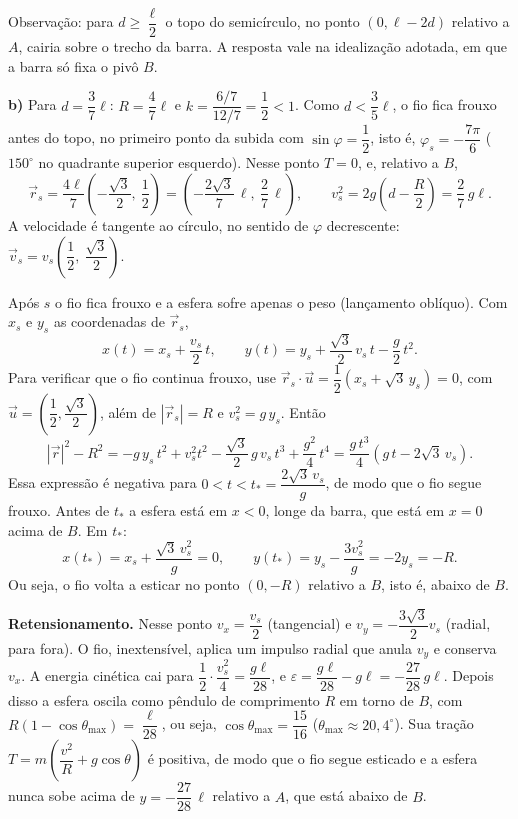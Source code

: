 \documentclass{article}%
\begin{document}
Observação: para $d\ge\dfrac{\ell}{2}$ o topo do semicírculo, no ponto $(0,\ell-2d)$ relativo a $A$, cairia sobre o trecho da barra. A resposta vale na idealização adotada, em que a barra só fixa o pivô $B$.

\textbf{b)} Para $d=\dfrac{3}{7}\ell$: $R=\dfrac{4}{7}\ell$ e $k=\dfrac{6/7}{12/7}=\dfrac{1}{2}<1$. Como $d<\dfrac{3}{5}\ell$, o fio fica frouxo antes do topo, no primeiro ponto da subida com $\sin\varphi=\dfrac{1}{2}$, isto é, $\varphi_s=-\dfrac{7\pi}{6}$ ($150^\circ$ no quadrante superior esquerdo). Nesse ponto $T=0$, e, relativo a $B$,
\[
\vec r_s=\frac{4\ell}{7}\left(-\frac{\sqrt3}{2},\ \frac12\right)=\left(-\frac{2\sqrt3}{7}\,\ell,\ \frac{2}{7}\,\ell\right),\qquad v_s^2=2g\left(d-\frac{R}{2}\right)=\frac{2}{7}\,g\ell .
\]
A velocidade é tangente ao círculo, no sentido de $\varphi$ decrescente: $\vec v_s=v_s\left(\dfrac12,\ \dfrac{\sqrt3}{2}\right)$.

Após $s$ o fio fica frouxo e a esfera sofre apenas o peso (lançamento oblíquo). Com $x_s$ e $y_s$ as coordenadas de $\vec r_s$,
\[
x(t)=x_s+\frac{v_s}{2}\,t,\qquad y(t)=y_s+\frac{\sqrt3}{2}\,v_s\,t-\frac{g}{2}\,t^2 .
\]
Para verificar que o fio continua frouxo, use $\vec r_s\cdot\vec u=\dfrac12(x_s+\sqrt3\,y_s)=0$, com $\vec u=\left(\dfrac12,\dfrac{\sqrt3}{2}\right)$, além de $|\vec r_s|=R$ e $v_s^2=g\,y_s$. Então
\[
|\vec r|^2-R^2=-g\,y_s\,t^2+v_s^2t^2-\frac{\sqrt3}{2}\,g\,v_s\,t^3+\frac{g^2}{4}\,t^4=\frac{g\,t^3}{4}\left(g\,t-2\sqrt3\,v_s\right).
\]
Essa expressão é negativa para $0<t<t_*=\dfrac{2\sqrt3\,v_s}{g}$, de modo que o fio segue frouxo. Antes de $t_*$ a esfera está em $x<0$, longe da barra, que está em $x=0$ acima de $B$. Em $t_*$:
\[
x(t_*)=x_s+\frac{\sqrt3\,v_s^2}{g}=0,\qquad y(t_*)=y_s-\frac{3v_s^2}{g}=-2y_s=-R .
\]
Ou seja, o fio volta a esticar no ponto $(0,-R)$ relativo a $B$, isto é, abaixo de $B$.

\textbf{Retensionamento.} Nesse ponto $v_x=\dfrac{v_s}{2}$ (tangencial) e $v_y=-\dfrac{3\sqrt3}{2}v_s$ (radial, para fora). O fio, inextensível, aplica um impulso radial que anula $v_y$ e conserva $v_x$. A energia cinética cai para $\dfrac{1}{2}\cdot\dfrac{v_s^2}{4}=\dfrac{g\ell}{28}$, e $\varepsilon=\dfrac{g\ell}{28}-g\ell=-\dfrac{27}{28}\,g\ell$. Depois disso a esfera oscila como pêndulo de comprimento $R$ em torno de $B$, com $R(1-\cos\theta_{\max})=\dfrac{\ell}{28}$, ou seja, $\cos\theta_{\max}=\dfrac{15}{16}$ ($\theta_{\max}\approx 20{,}4^\circ$). Sua tração $T=m\left(\dfrac{v^2}{R}+g\cos\theta\right)$ é positiva, de modo que o fio segue esticado e a esfera nunca sobe acima de $y=-\dfrac{27}{28}\,\ell$ relativo a $A$, que está abaixo de $B$.
\end{document}
